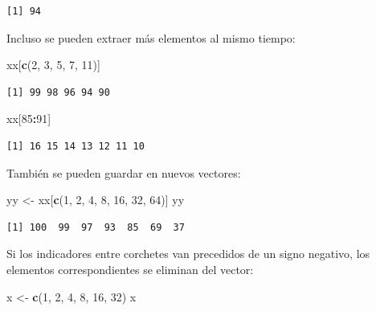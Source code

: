 \documentclass[
]{article}
\newenvironment{Shaded}{\begin{snugshade}}{\end{snugshade}}
\newcommand{\DecValTok}[1]{\textcolor[rgb]{0.00,0.00,0.81}{#1}}
\newcommand{\FunctionTok}[1]{\textcolor[rgb]{0.13,0.29,0.53}{\textbf{#1}}}
\newcommand{\NormalTok}[1]{#1}
\newcommand{\OtherTok}[1]{\textcolor[rgb]{0.56,0.35,0.01}{#1}}
\newcommand{\SpecialCharTok}[1]{\textcolor[rgb]{0.81,0.36,0.00}{\textbf{#1}}}
\begin{document}
\begin{verbatim}
[1] 94
\end{verbatim}

Incluso se pueden extraer más elementos al mismo tiempo:

\begin{Shaded}
\begin{Highlighting}[]
\NormalTok{xx[}\FunctionTok{c}\NormalTok{(}\DecValTok{2}\NormalTok{, }\DecValTok{3}\NormalTok{, }\DecValTok{5}\NormalTok{, }\DecValTok{7}\NormalTok{, }\DecValTok{11}\NormalTok{)]}
\end{Highlighting}
\end{Shaded}

\begin{verbatim}
[1] 99 98 96 94 90
\end{verbatim}

\begin{Shaded}
\begin{Highlighting}[]
\NormalTok{xx[}\DecValTok{85}\SpecialCharTok{:}\DecValTok{91}\NormalTok{]}
\end{Highlighting}
\end{Shaded}

\begin{verbatim}
[1] 16 15 14 13 12 11 10
\end{verbatim}

También se pueden guardar en nuevos vectores:

\begin{Shaded}
\begin{Highlighting}[]
\NormalTok{yy }\OtherTok{\textless{}{-}}\NormalTok{ xx[}\FunctionTok{c}\NormalTok{(}\DecValTok{1}\NormalTok{, }\DecValTok{2}\NormalTok{, }\DecValTok{4}\NormalTok{, }\DecValTok{8}\NormalTok{, }\DecValTok{16}\NormalTok{, }\DecValTok{32}\NormalTok{, }\DecValTok{64}\NormalTok{)]}
\NormalTok{yy}
\end{Highlighting}
\end{Shaded}

\begin{verbatim}
[1] 100  99  97  93  85  69  37
\end{verbatim}

Si los indicadores entre corchetes van precedidos de un signo negativo, los elementos correspondientes se eliminan del vector:

\begin{Shaded}
\begin{Highlighting}[]
\NormalTok{x }\OtherTok{\textless{}{-}} \FunctionTok{c}\NormalTok{(}\DecValTok{1}\NormalTok{, }\DecValTok{2}\NormalTok{, }\DecValTok{4}\NormalTok{, }\DecValTok{8}\NormalTok{, }\DecValTok{16}\NormalTok{, }\DecValTok{32}\NormalTok{)}
\NormalTok{x}
\end{Highlighting}
\end{Shaded}
\end{document}
